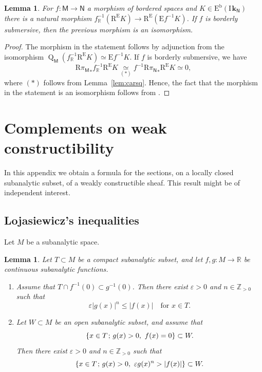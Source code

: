 \documentclass[JEP,XML,SOM,Unicode]{cedram}
\newenvironment{enumeratei}
{\bgroup\def\theenumi{\roman{enumi}}\def\theenumii{\alph{enumii}}\begin{enumerate}}
{\end{enumerate}\egroup}
\let\cl\colon
\newcommand{\semicolon}{\nobreak \mskip2mu\mathpunct{}\nonscript\mkern-\thinmuskip{;}\mskip6mu plus1mu\relax}
\theoremstyle{plain}
\newtheorem{lemma}[theorem]{Lemma}
\theoremstyle{definition}
\newcommand{\R}{\mathbb{R}}
\newcommand{\Z}{\mathbb{Z}}
\DeclareMathOperator{\quot}{Q}
\newcommand{\derived}[1]{\mathrm{#1}}
\newcommand{\dere}{\derived{E}}\let\enh\dere
\newcommand{\derr}{\derived{R}}
\newcommand{\BEC}[2][\ifield]{\dere^{\mathrm{b}}(#1_{#2})}
\newcommand{\roim}[1]{\derr#1_*}
\newcommand{\RE}{\operatorname{R^\enh}}
\newcommand{\Eopb}[1]{\enh#1^{-1}}
\newcommand{\field}{\mathbf{k}}\let\cor\field
\newcommand{\ind}{\mathrm{I}\mspace{2mu}}
\newcommand{\ifield}{\ind\field}
\newcommand{\bbM}{\mathsf{M}}
\newcommand{\bbN}{\mathsf{N}}
\newcommand{\opb}[1]{#1^{-1}}
\begin{document}
\begin{lemma}\label{lem:A3}
For $f\cl\bbM\to\bbN$ a morphism of bordered spaces and $K\in\BEC\bbN$
there is a natural morphism $\opb{f_\R}(\RE K)\to\RE(\Eopb f K)$.
If $f$ is borderly submersive, then the previous morphism is an isomorphism.
\end{lemma}
\begin{proof}
The morphism in the statement follows by adjunction from the isomorphism
$\quot_\bbM(\opb{f_\R}\RE K)\simeq\Eopb f K$.
If $f$ is borderly submersive, we have
\begin{equation*}
\roim{{\pi_\bbM}}\opb{f_\R}\RE K
\underset{(*)}\simeq\opb{f}\roim{{\pi_\bbN}}\RE K
\simeq0,
\end{equation*}
where $(*)$ follows from Lemma~\ref{lem:carsq}.
Hence, the fact that the morphism in the statement is an isomorphism follows from \cite[Prop.\,4.4.4(ii-b)]{DK16}.
\end{proof}

\section{Complements on weak constructibility}\label{se:wc}

In this appendix we obtain a formula for the sections, on a locally closed subanalytic subset, of a weakly constructible sheaf. This result might be of independent interest.

\subsection{Lojasiewicz's inequalities}

Let $ M$ be a subanalytic space.

\begin{lemma}\label{lem:Loj}
Let $T\subset M$ be a compact subanalytic subset, and
let $f,g\colon M\to \R$ be continuous subanalytic functions.
\begin{enumeratei}
\item\label{lem:Loji}
Assume that $T\cap\opb f(0)\subset\opb g(0)$. Then there exist $\varepsilon>0$ and $n\in\Z_{>0}$ such that
\[
\varepsilon|g(x)|^n \leq |f(x)| \quad\text{for }x\in T.
\]
\item\label{lem:Lojii}
Let $W\subset M$ be an open subanalytic subset,
and assume that
\begin{equation}\label{eq:Lojhyp}
\{x\in T\semicolon g(x)>0,\ f(x)=0 \} \subset W.
\end{equation}
Then there exist $\varepsilon>0$ and $n\in\Z_{>0}$ such that
\[
\{x\in T\semicolon g(x)>0,\ \varepsilon g(x)^n>|f(x)| \} \subset W.
\]
\end{enumeratei}
\end{lemma}
\end{document}

